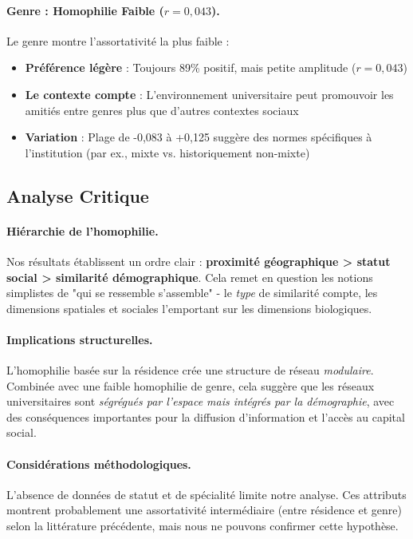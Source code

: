\documentclass[12pt,a4paper]{article}
\begin{document}
\paragraph{Genre : Homophilie Faible ($r=0,043$).}
Le genre montre l'assortativité la plus faible :
\begin{itemize}
    \item \textbf{Préférence légère} : Toujours 89\% positif, mais petite amplitude ($r=0,043$)
    \item \textbf{Le contexte compte} : L'environnement universitaire peut promouvoir les amitiés entre genres plus que d'autres contextes sociaux
    \item \textbf{Variation} : Plage de -0,083 à +0,125 suggère des normes spécifiques à l'institution (par ex., mixte vs. historiquement non-mixte)
\end{itemize}

\subsection{Analyse Critique}

\paragraph{Hiérarchie de l'homophilie.} Nos résultats établissent un ordre clair : \textbf{proximité géographique > statut social > similarité démographique}. Cela remet en question les notions simplistes de "qui se ressemble s'assemble" - le \textit{type} de similarité compte, les dimensions spatiales et sociales l'emportant sur les dimensions biologiques.

\paragraph{Implications structurelles.} L'homophilie basée sur la résidence crée une structure de réseau \textit{modulaire}. Combinée avec une faible homophilie de genre, cela suggère que les réseaux universitaires sont \textit{ségrégués par l'espace mais intégrés par la démographie}, avec des conséquences importantes pour la diffusion d'information et l'accès au capital social.

\paragraph{Considérations méthodologiques.} L'absence de données de statut et de spécialité limite notre analyse. Ces attributs montrent probablement une assortativité intermédiaire (entre résidence et genre) selon la littérature précédente, mais nous ne pouvons confirmer cette hypothèse.
\end{document}
